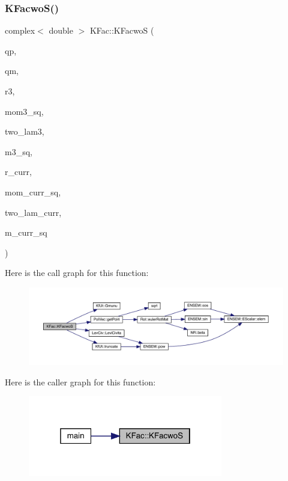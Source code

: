 \subsubsection{\texorpdfstring{KFacwoS()}{KFacwoS()}}
{\footnotesize\ttfamily complex$<$ double $>$ K\+Fac\+::\+K\+FacwoS (\begin{DoxyParamCaption}\item[{Eigen\+::\+Vector\+Xd \&}]{qp,  }\item[{Eigen\+::\+Vector\+Xd \&}]{qm,  }\item[{std\+::vector$<$ double $>$ \&}]{r3,  }\item[{double \&}]{mom3\+\_\+sq,  }\item[{const int \&}]{two\+\_\+lam3,  }\item[{double \&}]{m3\+\_\+sq,  }\item[{std\+::vector$<$ double $>$ \&}]{r\+\_\+curr,  }\item[{double \&}]{mom\+\_\+curr\+\_\+sq,  }\item[{const int \&}]{two\+\_\+lam\+\_\+curr,  }\item[{double \&}]{m\+\_\+curr\+\_\+sq }\end{DoxyParamCaption})}

Here is the call graph for this function\+:
\nopagebreak
\begin{figure}[H]
\begin{center}
\leavevmode
\includegraphics[width=350pt]{d2/d89/namespaceKFac_a2f18ad8b36ac24cc9534755cccb8c780_cgraph}
\end{center}
\end{figure}
Here is the caller graph for this function\+:
\nopagebreak
\begin{figure}[H]
\begin{center}
\leavevmode
\includegraphics[width=241pt]{d2/d89/namespaceKFac_a2f18ad8b36ac24cc9534755cccb8c780_icgraph}
\end{center}
\end{figure}
\mbox{\label{namespaceKFac_a2ae9d69821729f6946651703e8990e58}} 
